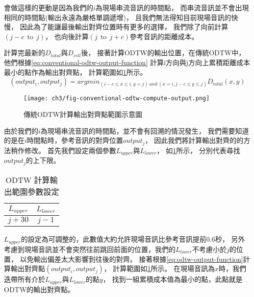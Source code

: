 \documentclass[class=NCU_thesis, crop=false]{standalone}
\begin{document}
會做這樣的更動是因為我們的$i$為現場串流音訊的時間點，
而串流音訊並不會出現相同的時間點(輸出永遠為嚴格單調遞增)，
且我們無法得知目前現場音訊的快慢，
因此為了能讓最後輸出對齊位置時有更多的選擇，
我們除了向前計算$(j-c \ \  \text{to} \ \  j)$，
也向後計算$(j \ \  \text{to} \ \  j+c)$參考音訊的距離成本。

計算完最新的$D_{total}$與$D_{cell}$後，
接著計算ODTW的輸出位置，在傳統ODTW中，
他們根據\cref{eq:conventional-odtw-output-function}
計算i方向與j方向上累積距離成本最小的點作為輸出對齊點，
計算範圍如\cref{fig:fig-ch3-conventional-odtw-compute-output}所示。
\begin{equation} 
    \label{eq:conventional-odtw-output-function}
    (output_i, output_j) = argmin_{(i-c \leq x \leq i, y=j)\ and\ (x=i, j-c \leq y \leq j)}D_{total}(x,y)
\end{equation}

\begin{figure}[H]
    \centering
    \texttt{[image: ch3/fig-conventional-odtw-compute-output.png]}
    \caption{傳統ODTW計算輸出對齊點範圍示意圖}
    \label{fig:fig-ch3-conventional-odtw-compute-output}
\end{figure}

由於我們的$i$為現場串流音訊的時間點，並不會有回溯的情況發生，
我們需要知道的是在$i$時間點時，參考音訊的對齊位置$output_j$，
因此我們將計算輸出對齊的的方法稍作修改。
首先我們設定兩個參數$L_{upper}$與$L_{lower}$，
如\cref{table:table-odtw-compute-outputj-parameter-setting}所示，
分別代表尋找$output_j$的上下限。
\begin{table}[h]
    \centering
    \caption{ODTW 計算輸出範圍參數設定}
    \label{table:table-odtw-compute-outputj-parameter-setting}
    \begin{tabular}{|c|c|}
        \hline
        \multicolumn{1}{|c|}{$L_{upper}$} & \multicolumn{1}{|c|}{$L_{lower}$}\\
        \hline
        $j+30$ & $j-1$ \\
        \hline
    \end{tabular}
\end{table}
$L_{upper}$的設定為可調整的，此數值大約允許現場音訊比參考音訊提前0.6秒，
另外考慮到現場音訊並不會突然往前跳回前面的位置，我們的$L_{lower}$不考慮小於$j$的位置，
以免輸出偏差太大影響到往後的對齊。
接著根據\cref{eq:odtw-output-function}計算輸出對齊點$(output_i, output_j)$，
計算範圍如\cref{fig:fig-ch3-conventional-odtw-compute-output}所示。
在現場音訊為$x$時，我們迭帶所有介於$L_{upper}$與$L_{lower}$的點$y$，
找到一組累積成本值為最小的點，此點就是ODTW的輸出對齊點。
\end{document}
